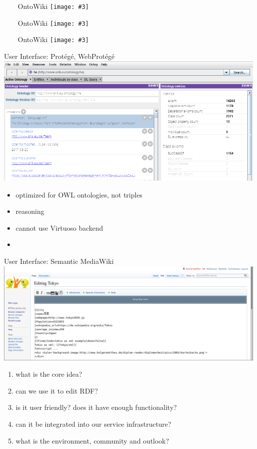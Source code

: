 \documentclass[aspectratio=1610]{beamer}
\newcommand{\imageslide}[4][]
{
\begin{frame}[plain]{~~~~#2}
\vspace{0.2em}
\centering\texttt{[image: \#3]}
\\#1
\note{#4}
\end{frame}
}
\begin{document}
\imageslide{OntoWiki}{img/ontowiki.png}{}{}
\imageslide{OntoWiki}{img/ontowiki-ceo.png}{}{}
\imageslide{OntoWiki}{img/ontowiki-ceo-edit.png}{}{}

\begin{frame}{User Interface: Prot\'eg\'e, WebProt\'eg\'e}
\centering
\includegraphics[width=0.6\paperwidth]{img/protege.png}
\begin{itemize}
\item optimized for OWL ontologies, not triples
\item reasoning
\item cannot use Virtuoso backend
\item 
\end{itemize}
\end{frame}

\begin{frame}{User Interface: Semantic MediaWiki}
\centering
\includegraphics[width=0.6\paperwidth]{img/smw-tokyo.png}
\begin{enumerate}
\item what is the core idea?
\item can we use it to edit RDF?
\item is it user friendly? does it have enough functionality?
\item can it be integrated into our service infrastructure?
\item what is the environment, community and outlook?
\end{enumerate}
\end{frame}
\end{document}
